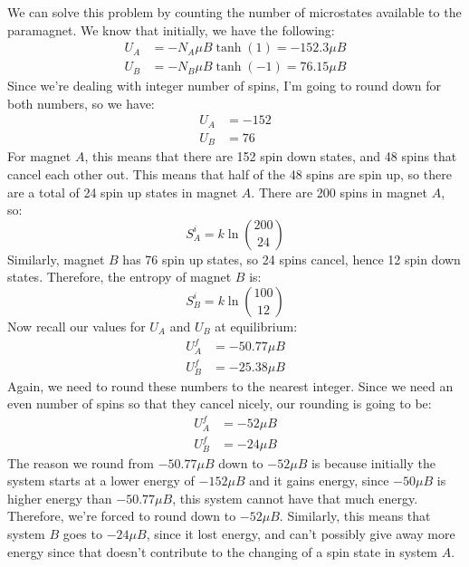 \documentclass[10pt]{article}
\begin{document}
\begin{enumerate}[label=\alph*)]
			\begin{solution}
				We can solve this problem by counting the number of microstates available to the 
				paramagnet. We know that initially, we have the following:
				\begin{align*}
					U_A &= -N_A \mu B \tanh(1) = -152.3 \mu B \\
					U_B &= -N_B \mu B \tanh(-1) = 76.15 \mu B
			\end{align*} 
				Since we're dealing with integer number of spins, I'm going to round down for both numbers, 
				so we have:
				\begin{align*}
					U_A &= -152 \\ 
					U_B &= 76
			\end{align*} 
				For magnet $A$, this means that there are 152 spin down states, and 48 spins that cancel each 
				other out. This means that half of the 48 spins are spin up, so there are a total of 24 spin 
				up states in magnet $A$. There are 200 spins in magnet $A$, so:
				\[
					S_A^i = k \ln {200 \choose 24}
				\] 
				Similarly, magnet $B$ has 76 spin up states, so 24 spins cancel, hence 12 spin down states.
				Therefore, the entropy of magnet $B$ is:
				\[
					S_B^i = k \ln {100 \choose 12}
				\] 
				Now recall our values for $U_A$ and $U_B$ at equilibrium:
				\begin{align*}
					U_A^f &= -50.77 \mu B\\
					U_B^f &= -25.38 \mu B 
				\end{align*}
				Again, we need to round these numbers to the nearest integer. Since we need an even number 
				of spins so that they cancel nicely, our rounding is going to be:
				\begin{align*}
					U_A^f &=  -52 \mu B \\
					U_B^f &= -24 \mu B
				\end{align*}
				The reason we round from $-50.77\mu B$ down to $-52\mu B$ is because initially the 
				system starts at a 
				lower energy of $-152 \mu B$ and it gains energy, since $-50 \mu B$ is higher energy 
				than $-50.77 \mu B$, this system cannot have that much energy. Therefore, we're forced
				to round down to $-52 \mu B$. Similarly, this means that system $B$ goes to $-24 \mu B$, 
				since it lost energy, and can't possibly give away more energy since that doesn't 
				contribute to the changing of a spin state in system $A$. 


\end{solution}
\end{enumerate}
\end{document}
